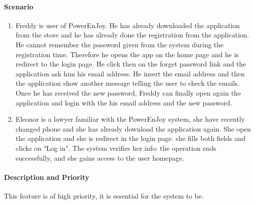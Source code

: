 \paragraph{Scenario}
\begin {enumerate}
\item Freddy is user of PowerEnJoy. He has already downloaded the application from the store and he has already done the registration from the application. He cannot remember the password given from the system during the registration time. Therefore he opens the app on the home page and he is redirect to the login page. He click then on the forget password link and the application ask him his email address. He insert the email address and then the application show another message telling the user to check the emails. Once he has received the new password, Freddy can finally open again the application and login with the his email address and the new password.
\item Eleonor is a lawyer familiar with the PowerEnJoy system, she have recently changed phone and she has already download the application again. She open the application and she is redirect in the login page. she fills both fields and clicks on "Log in". The system verifies her info: the operation ends successfully, and she gains access to the user homepage.
\end{enumerate}
\paragraph{Description and Priority}
This feature is of high priority, it is essential for the system to be.
